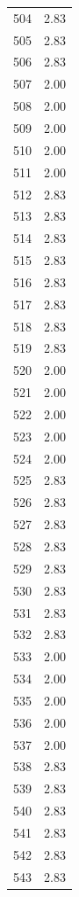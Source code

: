 \documentclass[a4paper,11pt]{article}
\begin{document}
\begin{center}
\begin{longtable}{|R{1.5cm}|R{2.5cm}|}
  504  &         2.83 \\ 
  505  &         2.83 \\ 
  506  &         2.83 \\ 
  507  &         2.00 \\ 
  508  &         2.00 \\ 
  509  &         2.00 \\ 
  510  &         2.00 \\ 
  511  &         2.00 \\ 
  512  &         2.83 \\ 
  513  &         2.83 \\ 
  514  &         2.83 \\ 
  515  &         2.83 \\ 
  516  &         2.83 \\ 
  517  &         2.83 \\ 
  518  &         2.83 \\ 
  519  &         2.83 \\ 
  520  &         2.00 \\ 
  521  &         2.00 \\ 
  522  &         2.00 \\ 
  523  &         2.00 \\ 
  524  &         2.00 \\ 
  525  &         2.83 \\ 
  526  &         2.83 \\ 
  527  &         2.83 \\ 
  528  &         2.83 \\ 
  529  &         2.83 \\ 
  530  &         2.83 \\ 
  531  &         2.83 \\ 
  532  &         2.83 \\ 
  533  &         2.00 \\ 
  534  &         2.00 \\ 
  535  &         2.00 \\ 
  536  &         2.00 \\ 
  537  &         2.00 \\ 
  538  &         2.83 \\ 
  539  &         2.83 \\ 
  540  &         2.83 \\ 
  541  &         2.83 \\ 
  542  &         2.83 \\ 
  543  &         2.83 \\ 

\end{longtable}
\end{center}
\end{document}
